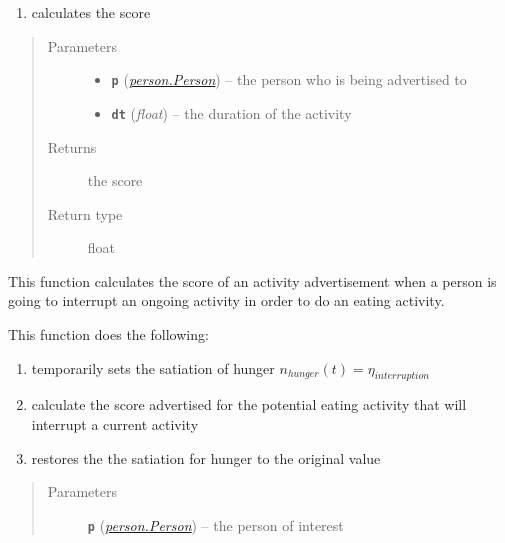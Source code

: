 \documentclass[letterpaper,10pt,english]{sphinxmanual}
\begin{document}
\begin{fulllineitems}
\begin{fulllineitems}
\begin{enumerate}
\item {} 
calculates the score

\end{enumerate}
\begin{quote}\begin{description}
\item[{Parameters}] \leavevmode\begin{itemize}
\item {} 
\textbf{\texttt{p}} ({\hyperref[person:person.Person]{\emph{\emph{person.Person}}}}) -- the person who is being advertised to

\item {} 
\textbf{\texttt{dt}} (\emph{float}) -- the duration of the activity

\end{itemize}

\item[{Returns}] \leavevmode
the score

\item[{Return type}] \leavevmode
float

\end{description}\end{quote}

\end{fulllineitems}


\begin{fulllineitems}
\label{eat:eat.Eat.advertise_interruption}
This function calculates the score of an activity advertisement when a person is going to interrupt an         ongoing activity in order to do an eating activity.

This function does the following:
\begin{enumerate}
\item {} 
temporarily sets the satiation of hunger  \(n_{hunger}(t) = \eta_{interruption}\)

\item {} 
calculate the score advertised for the potential eating activity that will interrupt a current activity

\item {} 
restores the the satiation for hunger to the original value

\end{enumerate}
\begin{quote}\begin{description}
\item[{Parameters}] \leavevmode
\textbf{\texttt{p}} ({\hyperref[person:person.Person]{\emph{\emph{person.Person}}}}) -- the person of interest


\end{description}
\end{quote}
\end{fulllineitems}
\end{fulllineitems}
\end{document}
